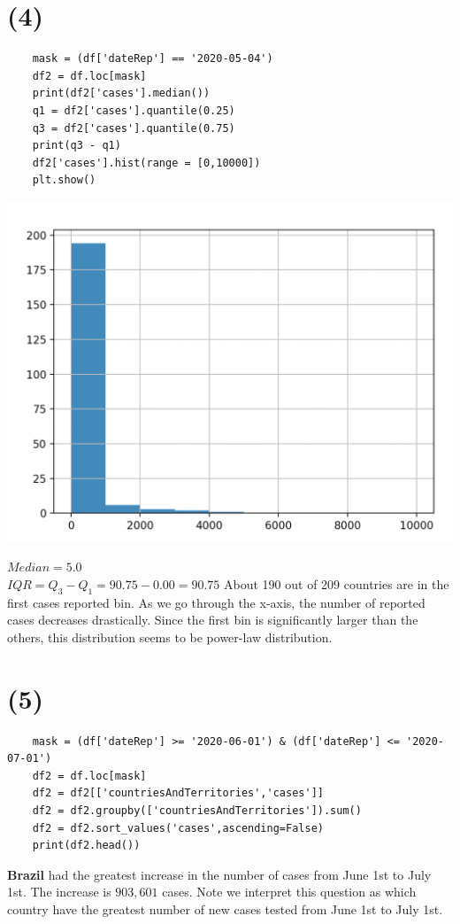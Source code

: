 \documentclass[12pt]{article}
\begin{document}
\section*{(4)}
\begin{lstlisting}
    mask = (df['dateRep'] == '2020-05-04')
    df2 = df.loc[mask]
    print(df2['cases'].median())
    q1 = df2['cases'].quantile(0.25)
    q3 = df2['cases'].quantile(0.75)
    print(q3 - q1)
    df2['cases'].hist(range = [0,10000])
    plt.show()
\end{lstlisting}
\begin{center}
    \includegraphics[scale=0.5]{fig/p4.png}
\end{center}
$Median = 5.0$\\
$IQR = Q_{3} - Q_{1} = 90.75 - 0.00 = 90.75$
About 190 out of 209 countries are in the first cases reported bin. As we go through the x-axis, the number of reported cases decreases drastically.
Since the first bin is significantly larger than the others, this distribution seems to be power-law distribution.

\section*{(5)}
\begin{lstlisting}
    mask = (df['dateRep'] >= '2020-06-01') & (df['dateRep'] <= '2020-07-01')
    df2 = df.loc[mask]
    df2 = df2[['countriesAndTerritories','cases']]
    df2 = df2.groupby(['countriesAndTerritories']).sum()
    df2 = df2.sort_values('cases',ascending=False)
    print(df2.head())
\end{lstlisting}
\textbf{Brazil} had the greatest increase in the number of cases from June 1st to July 1st. The increase is $903,601$ cases. Note we interpret this question as which country have the greatest number of new cases tested from June 1st to July 1st.
\end{document}
